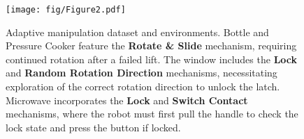 \begin{figure}
\texttt{[image: fig/Figure2.pdf]}
\caption{
Adaptive manipulation dataset and environments. Bottle and Pressure Cooker feature the \textbf{Rotate \& Slide} mechanism, requiring continued rotation after a failed lift. The window includes the \textbf{Lock} and \textbf{Random Rotation Direction} mechanisms, necessitating exploration of the correct rotation direction to unlock the latch. Microwave incorporates the \textbf{Lock} and \textbf{Switch Contact} mechanisms, where the robot must first pull the handle to check the lock state and press the button if locked.
}
\vspace{-0.5cm}
\label{fig:fig2}
\end{figure}
